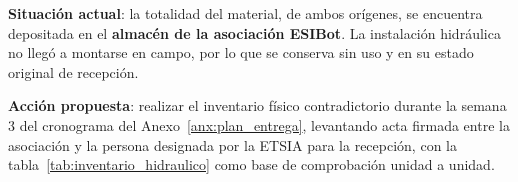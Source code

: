 \textbf{Situaci\'on actual}: la totalidad del material, de ambos
or\'igenes, se encuentra depositada en el \textbf{almac\'en de la
asociaci\'on ESIBot}. La instalaci\'on hidr\'aulica no lleg\'o a montarse
en campo, por lo que se conserva sin uso y en su estado original de
recepci\'on.

\textbf{Acci\'on propuesta}: realizar el inventario f\'isico contradictorio
durante la semana 3 del cronograma del Anexo~\ref{anx:plan_entrega},
levantando acta firmada entre la asociaci\'on y la persona designada por
la ETSIA para la recepci\'on, con la tabla~\ref{tab:inventario_hidraulico}
como base de comprobaci\'on unidad a unidad.